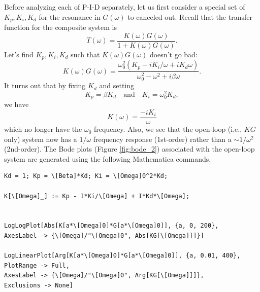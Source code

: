 \documentclass{article}
\theoremstyle{definition}
\newcommand{\f}[2]{\frac{#1}{#2}}
\begin{document}
Before analyzing each of P-I-D separately, let us first consider a special set of $K_p, K_i, K_d$ for the resonance in $G(\omega)$ to canceled out. Recall that the transfer function for the composite system is 
\begin{equation*}
T(\omega) = \f{K(\omega)G(\omega)}{1+K(\omega) G(\omega)}.
\end{equation*}
Let's find $K_p, K_i,K_d$ such that $K(\omega) G(\omega)$ doesn't go bad:
\begin{equation*}
K(\omega) G(\omega) = \f{\omega_0^2( K_p - iK_i/\omega + iK_d \omega)}{\omega_0^2 - \omega^2 + i\beta \omega}.
\end{equation*}
It turns out that by fixing $K_d$ and setting 
\begin{equation*}
K_p  =\beta K_d \quad \text{and} \quad K_i = \omega_0^2 K_d,
\end{equation*}
we have
\begin{equation*}
K(\omega) = \f{-iK_i}{\omega}
\end{equation*}
which no longer have the $\omega_0$ frequency. Also, we see that the open-loop (i.e., $KG$ only) system now has a $1/\omega$ frequency response (1st-order) rather than a $\sim 1/\omega^2$ (2nd-order). The Bode plots (Figure \ref{fig:bode_2}) associated with the open-loop system are generated using the following Mathematica commands. 
\begin{lstlisting}
Kd = 1; Kp = \[Beta]*Kd; Ki = \[Omega]0^2*Kd;

K[\[Omega]_] := Kp - I*Ki/\[Omega] + I*Kd*\[Omega]; 


LogLogPlot[Abs[K[a*\[Omega]0]*G[a*\[Omega]0]], {a, 0, 200}, 
AxesLabel -> {\[Omega]/"\[Omega]0", Abs[KG[\[Omega]]]}]

LogLinearPlot[Arg[K[a*\[Omega]0]*G[a*\[Omega]0]], {a, 0.01, 400}, 
PlotRange -> Full, 
AxesLabel -> {\[Omega]/"\[Omega]0", Arg[KG[\[Omega]]]}, 
Exclusions -> None]
\end{lstlisting}
\end{document}
